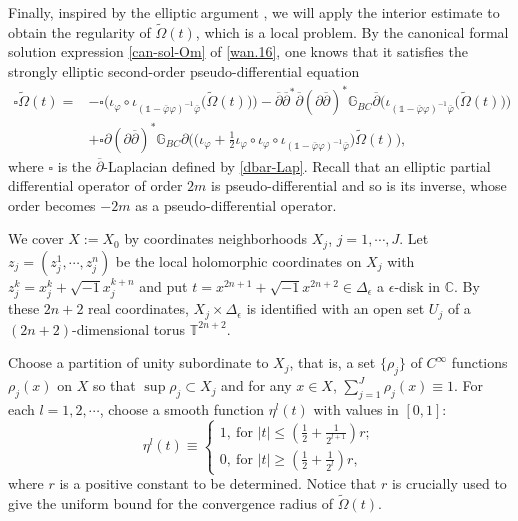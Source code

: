 \documentclass[12pt]{amsart}
\numberwithin{equation}{section}
\renewcommand{\1}{\mathds{1}}
\newcommand{\G}{\mathbb{G}}
\newcommand{\db}{\overline{\partial}}
\renewcommand{\>}{\rightarrow}
\newcommand{\p}{\partial}
\def\p{\partial}
\def\b{\bar}
\begin{document}
Finally, inspired by the elliptic argument \cite[Appendix.\S 8]{k},
we will apply the interior estimate to obtain the regularity of
$\tilde{\Omega}(t)$, which is a local problem. By the canonical
formal solution expression \eqref{can-sol-Om} of \eqref{wan.16}, one
knows that it satisfies the strongly elliptic second-order
pseudo-differential equation
\begin{equation}
\label{reg-eqn}
\begin{aligned}
\square\tilde{\Omega}(t)
 =&-\square\Big( \iota_{\varphi}\circ
\iota_{(\1-\b{\varphi}\varphi)^{-1}\b{\varphi}} \big(
\tilde{\Omega}(t)\big) \Big) -\db \db^*\db(\p\db)^* \G_{BC} \db
\Big( \iota_{(\1-\b{\varphi}\varphi)^{-1}\b{\varphi}} \big(
\tilde{\Omega}(t) \big) \Big)\\
& + \square\p (\p\db)^* \G_{BC} \p \Big( \big( \iota_{\varphi}+
\frac{1}{2} \iota_{\varphi}\circ \iota_{\varphi}\circ
\iota_{(\1-\b{\varphi}\varphi)^{-1}\b{\varphi}}\big)\tilde{\Omega}(t)
\Big),
\end{aligned}
\end{equation}
where $\square$ is the $\db$-Laplacian defined by \eqref{dbar-Lap}.
Recall that an elliptic partial differential operator of order $2m$ is
pseudo-differential and so is its inverse, whose order becomes $-2m$
as a pseudo-differential operator.


We cover $X:=X_0$ by coordinates neighborhoods $X_j$, $j=1,\cdots,
J$. Let $z_j=(z_j^1,\cdots,z_j^n)$ be the local holomorphic
coordinates on $X_j$ with $z_j^k=x_j^k+\sqrt{-1}x_j^{k+n}$ and put
$t=x^{2n+1}+\sqrt{-1}x^{2n+2}\in \Delta_{\epsilon}$ a $\epsilon$-disk in
$\mathbb{C}$. By these $2n+2$
real coordinates, $X_j\times \Delta_{\epsilon}$ is identified with
an open set $U_j$ of a $(2n+2)$-dimensional torus
$\mathds{T}^{2n+2}$.


Choose a partition of unity subordinate to $X_j$, that is, a set
$\{\rho_j\}$ of $C^\infty$ functions $\rho_j(x)$ on $X$ so that
$\sup\rho_j\subset X_j$ and for any $x\in X$,
$\sum_{j=1}^{J}\rho_j(x)\equiv 1$. For each $l=1,2,\cdots$, choose a
smooth function $\eta^l(t)$ with values in $[0,1]$:
\begin{equation}\label{eta-l}
\eta^l(t)\equiv
    \begin{cases}
      1,\ \text{for $|t|\leq (\frac{1}{2}+\frac{1}{2^{l+1}})r$};\\
      0,\ \text{for $|t|\geq (\frac{1}{2}+\frac{1}{2^{l}})r$},
    \end{cases}
 \end{equation}
where $r$ is a positive constant to be determined. Notice that $r$
is crucially used to give the uniform bound for the convergence
radius of $\tilde{\Omega}(t)$.
\end{document}
